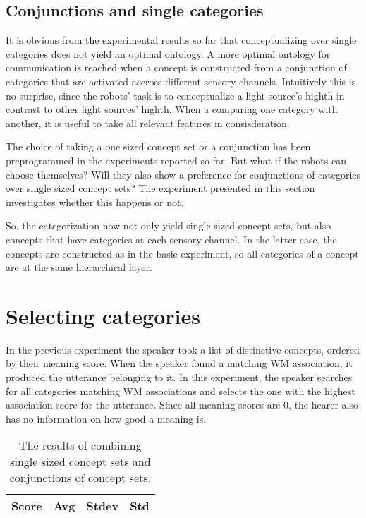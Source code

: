 \subsection{Conjunctions and single categories}


It is obvious from the experimental results so far that conceptualizing over single categories does not yield an optimal ontology. A more optimal ontology for communication is reached when a concept is constructed from a conjunction of categories that are activated accross different sensory channels. Intuitively this is no surprise, since the robots' task is to conceptualize a light source's highth in contrast to other light sources' highth. When a comparing one category with another, it is useful to take all relevant features in consisderation.

The choice of taking a one sized concept set or a conjunction has been preprogrammed in the experiments reported so far. But what if the robots can choose themselves? Will they also show a preference for conjunctions of categories over single sized concept sets? The experiment presented in this section investigates whether this happens or not.

So, the categorization now not only yield single sized concept sets, but also concepts that have categories at each sensory channel. In the latter case, the concepts are constructed as in the basic experiment, so all categories of a concept are at the same hierarchical layer.

\section{Selecting categories}

In the previous experiment the speaker took a list of distinctive concepts, ordered by their meaning score. When the speaker found a matching WM association, it produced the utterance belonging to it. In this experiment, the speaker searches for all categories matching WM associations and selects the one with the highest association score for the utterance. Since all meaning scores are 0, the hearer also has no information on how good a meaning is. 

\begin{table}
\begin{tabular}{||l|c|c|c||}
\hline\hline
Score & Avg & Stdev & Std\\\hline

\hline
\end{tabular}
\caption{The results of combining single sized concept sets and conjunctions of concept sets.}
\label{t:cat:sel}
\end{table}

